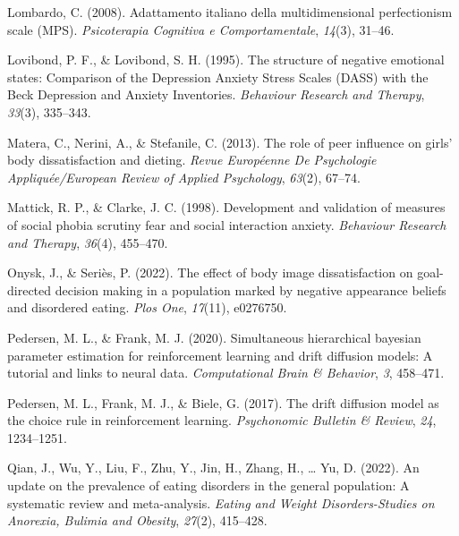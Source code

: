\documentclass[
  man,floatsintext]{apa6}
\newlength{\cslhangindent}
\newlength{\cslentryspacingunit} %
\newenvironment{CSLReferences}[2] %
 {%
  \setlength{\parindent}{0pt}
  \ifodd #1
  \let\oldpar\par
  \def\par{\hangindent=\cslhangindent\oldpar}
  \fi
  \setlength{\parskip}{#2\cslentryspacingunit}
 }%
 {}
\begin{document}
\begin{CSLReferences}{1}{0}
\leavevmode{}%
Lombardo, C. (2008). Adattamento italiano della multidimensional perfectionism scale (MPS). \emph{Psicoterapia Cognitiva e Comportamentale}, \emph{14}(3), 31--46.

\leavevmode{}%
Lovibond, P. F., \& Lovibond, S. H. (1995). {The structure of negative emotional states: Comparison of the Depression Anxiety Stress Scales (DASS) with the Beck Depression and Anxiety Inventories}. \emph{Behaviour Research and Therapy}, \emph{33}(3), 335--343.

\leavevmode{}%
Matera, C., Nerini, A., \& Stefanile, C. (2013). The role of peer influence on girls' body dissatisfaction and dieting. \emph{Revue Europ{é}enne De Psychologie Appliqu{é}e/European Review of Applied Psychology}, \emph{63}(2), 67--74.

\leavevmode{}%
Mattick, R. P., \& Clarke, J. C. (1998). Development and validation of measures of social phobia scrutiny fear and social interaction anxiety. \emph{Behaviour Research and Therapy}, \emph{36}(4), 455--470.

\leavevmode{}%
Onysk, J., \& Seriès, P. (2022). The effect of body image dissatisfaction on goal-directed decision making in a population marked by negative appearance beliefs and disordered eating. \emph{Plos One}, \emph{17}(11), e0276750.

\leavevmode{}%
Pedersen, M. L., \& Frank, M. J. (2020). Simultaneous hierarchical bayesian parameter estimation for reinforcement learning and drift diffusion models: A tutorial and links to neural data. \emph{Computational Brain \& Behavior}, \emph{3}, 458--471.

\leavevmode{}%
Pedersen, M. L., Frank, M. J., \& Biele, G. (2017). The drift diffusion model as the choice rule in reinforcement learning. \emph{Psychonomic Bulletin \& Review}, \emph{24}, 1234--1251.

\leavevmode{}%
Qian, J., Wu, Y., Liu, F., Zhu, Y., Jin, H., Zhang, H., \ldots{} Yu, D. (2022). An update on the prevalence of eating disorders in the general population: A systematic review and meta-analysis. \emph{Eating and Weight Disorders-Studies on Anorexia, Bulimia and Obesity}, \emph{27}(2), 415--428.


\end{CSLReferences}
\end{document}
